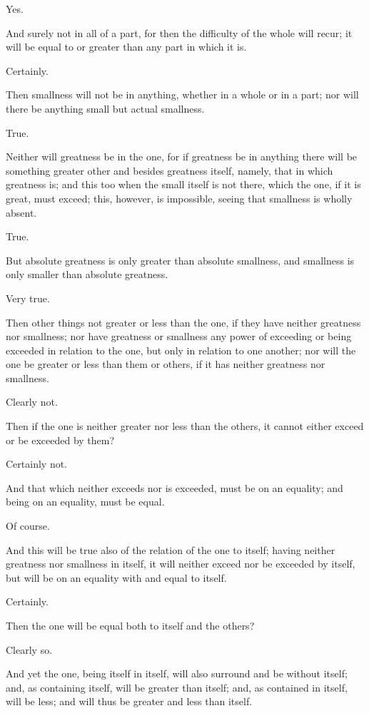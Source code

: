 Yes.

And surely not in all of a part, for then the difficulty of the whole
will recur; it will be equal to or greater than any part in which it is.

Certainly.

Then smallness will not be in anything, whether in a whole or in a part;
nor will there be anything small but actual smallness.

True.

Neither will greatness be in the one, for if greatness be in anything
there will be something greater other and besides greatness itself,
namely, that in which greatness is; and this too when the small itself
is not there, which the one, if it is great, must exceed; this, however,
is impossible, seeing that smallness is wholly absent.

True.

But absolute greatness is only greater than absolute smallness, and
smallness is only smaller than absolute greatness.

Very true.

Then other things not greater or less than the one, if they have neither
greatness nor smallness; nor have greatness or smallness any power of
exceeding or being exceeded in relation to the one, but only in relation
to one another; nor will the one be greater or less than them or others,
if it has neither greatness nor smallness.

Clearly not.

Then if the one is neither greater nor less than the others, it cannot
either exceed or be exceeded by them?

Certainly not.

And that which neither exceeds nor is exceeded, must be on an equality;
and being on an equality, must be equal.

Of course.

And this will be true also of the relation of the one to itself; having
neither greatness nor smallness in itself, it will neither exceed nor be
exceeded by itself, but will be on an equality with and equal to itself.

Certainly.

Then the one will be equal both to itself and the others?

Clearly so.

And yet the one, being itself in itself, will also surround and be
without itself; and, as containing itself, will be greater than itself;
and, as contained in itself, will be less; and will thus be greater and
less than itself.

